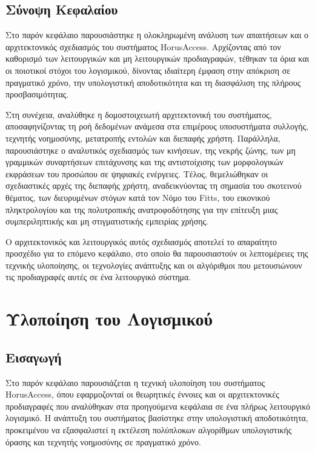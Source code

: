 \documentclass[twoside, a4paper, 11pt]{article}
\newcommand{\textlatin}[1]{\textenglish{#1}}
\begin{document}
\subsection{Σύνοψη Κεφαλαίου}
Στο παρόν κεφάλαιο παρουσιάστηκε η ολοκληρωμένη ανάλυση των απαιτήσεων και ο αρχιτεκτονικός σχεδιασμός του συστήματος \textlatin{HorusAccess}. Αρχίζοντας από τον καθορισμό των λειτουργικών και μη λειτουργικών προδιαγραφών, τέθηκαν τα όρια και οι ποιοτικοί στόχοι του λογισμικού, δίνοντας ιδιαίτερη έμφαση στην απόκριση σε πραγματικό χρόνο, την υπολογιστική αποδοτικότητα και τη διασφάλιση της πλήρους προσβασιμότητας.

Στη συνέχεια, αναλύθηκε η δομοστοιχειωτή αρχιτεκτονική του συστήματος, αποσαφηνίζοντας τη ροή δεδομένων ανάμεσα στα επιμέρους υποσυστήματα συλλογής, τεχνητής νοημοσύνης, μετατροπής εντολών και διεπαφής χρήστη. Παράλληλα, παρουσιάστηκε ο αναλυτικός σχεδιασμός των κινήσεων, της νεκρής ζώνης, των μη γραμμικών συναρτήσεων επιτάχυνσης και της αντιστοίχισης των μορφολογικών εκφράσεων του προσώπου σε ψηφιακές ενέργειες. Τέλος, θεμελιώθηκαν οι σχεδιαστικές αρχές της διεπαφής χρήστη, αναδεικνύοντας τη σημασία του σκοτεινού θέματος, των διευρυμένων στόγων κατά τον Νόμο του \textlatin{Fitts}, του εικονικού πληκτρολογίου και της πολυτροπικής ανατροφοδότησης για την επίτευξη μιας συμπεριληπτικής και μη στιγματιστικής εμπειρίας χρήσης.

Ο αρχιτεκτονικός και λειτουργικός αυτός σχεδιασμός αποτελεί το απαραίτητο προσχέδιο για το επόμενο κεφάλαιο, στο οποίο θα παρουσιαστούν οι λεπτομέρειες της τεχνικής υλοποίησης, οι τεχνολογίες ανάπτυξης και οι αλγόριθμοι που μετουσιώνουν τις προδιαγραφές αυτές σε ένα λειτουργικό σύστημα.

\clearpage
\section{Υλοποίηση του Λογισμικού}

\subsection{Εισαγωγή}

Στο παρόν κεφάλαιο παρουσιάζεται η τεχνική υλοποίηση του συστήματος HorusAccess, 
όπου εφαρμοζονταί οι θεωρητικές έννοιες και οι αρχιτεκτονικές προδιαγραφές που αναλύθηκαν στα προηγούμενα κεφάλαια 
σε ένα πλήρως λειτουργικό λογισμικό. Η ανάπτυξη του συστήματος βασίστηκε στην υπολογιστική αποδοτικότητα, 
προκειμένου να εξασφαλιστεί η εκτέλεση πολύπλοκων αλγορίθμων υπολογιστικής όρασης και τεχνητής νοημοσύνης σε πραγματικό χρόνο.
\end{document}
